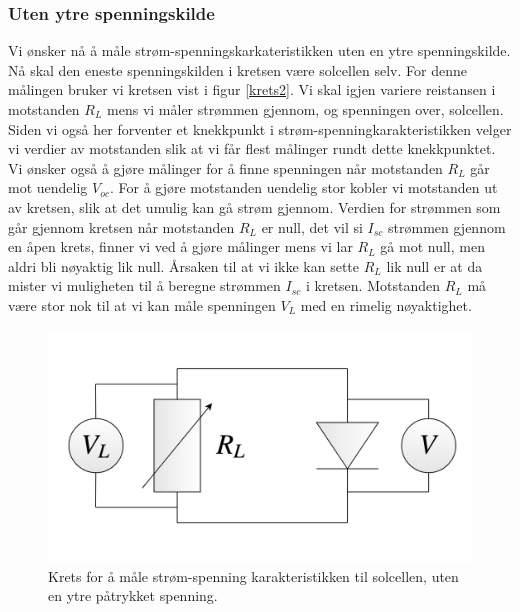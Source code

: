 \documentclass[%
 reprint,
 amsmath,amssymb,
 aps,
 norsk,
 booktabs
]{revtex4-1}
\begin{document}
\subsubsection{Uten ytre spenningskilde}
Vi ønsker nå å måle strøm-spenningskarkateristikken uten en ytre spenningskilde. Nå skal den eneste spenningskilden i kretsen være solcellen selv. For denne målingen bruker vi kretsen vist i figur \vref{krets2}. Vi skal igjen variere reistansen i motstanden $R_L$ mens vi måler strømmen gjennom, og spenningen over, solcellen. Siden vi også her forventer et knekkpunkt i strøm-spenningkarakteristikken velger vi verdier av motstanden slik at vi får flest målinger rundt dette knekkpunktet. Vi ønsker også å gjøre målinger for å finne spenningen når motstanden $R_L$ går mot uendelig $V_{oc}$. For å gjøre motstanden uendelig stor kobler vi motstanden ut av kretsen, slik at det umulig kan gå strøm gjennom. Verdien for strømmen som går gjennom kretsen når motstanden $R_L$ er null, det vil si $I_{sc}$ strømmen gjennom en åpen krets, finner vi ved å gjøre målinger mens vi lar $R_L$ gå mot null, men aldri bli nøyaktig lik null. Årsaken til at vi ikke kan sette $R_L$ lik null er at da mister vi muligheten til å beregne strømmen $I_{sc}$ i kretsen. Motstanden $R_L$ må være stor nok til at vi kan måle spenningen $V_L$ med en rimelig nøyaktighet.
\begin{figure}[h!]
  \centering
  \includegraphics[scale=0.17]{krets2.png}
  \caption{Krets for å måle strøm-spenning karakteristikken til solcellen, uten en ytre påtrykket spenning.}
  \label{krets2}
\end{figure}
\end{document}
